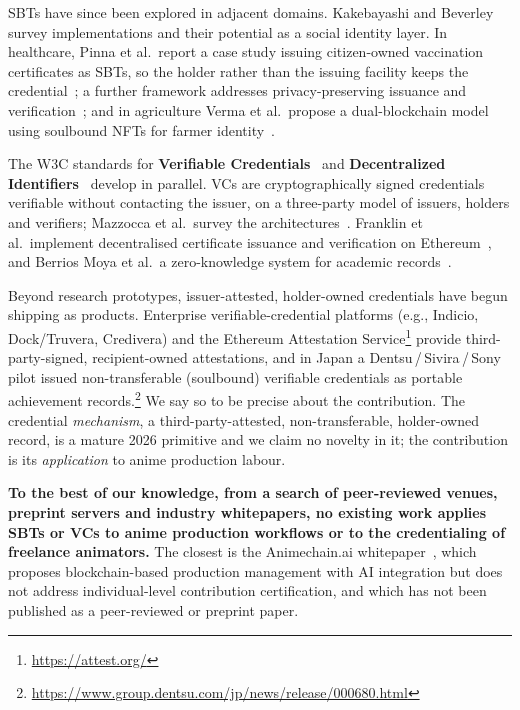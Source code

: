 SBTs have since been explored in adjacent domains. Kakebayashi and
Beverley~\cite{kakebayashi2023sbt} survey implementations and their potential as a social
identity layer. In healthcare, Pinna et al.\ report a case study issuing citizen-owned
vaccination certificates as SBTs, so the holder rather than the issuing facility keeps the
credential~\cite{sbt_health2024}; a further framework addresses privacy-preserving
issuance and verification~\cite{sbt_credential_framework2023}; and in agriculture Verma
et al.\ propose a dual-blockchain model using soulbound NFTs for farmer
identity~\cite{verma2025sbt_agriculture}.

The W3C standards for \textbf{Verifiable Credentials}~\cite{sporny2022vc} and
\textbf{Decentralized Identifiers}~\cite{sporny2022did} develop in parallel. VCs are
cryptographically signed credentials verifiable without contacting the issuer, on a
three-party model of issuers, holders and verifiers; Mazzocca et al.\ survey the
architectures~\cite{did_survey2024}. Franklin et al.\ implement decentralised certificate
issuance and verification on Ethereum~\cite{franklin2025decentralized}, and Berrios Moya
et al.\ a zero-knowledge system for academic records~\cite{berriosmoya2025zkp}.

Beyond research prototypes, issuer-attested, holder-owned credentials have begun
shipping as products. Enterprise verifiable-credential platforms (e.g., Indicio,
Dock/Truvera, Credivera) and the Ethereum Attestation Service\footnote{\url{https://attest.org/}}
provide third-party-signed, recipient-owned attestations, and in Japan a
Dentsu\,/\,Sivira\,/\,Sony pilot issued non-transferable (soulbound) verifiable
credentials as portable achievement records.\footnote{\url{https://www.group.dentsu.com/jp/news/release/000680.html}}
We say so to be precise about the contribution. The credential \emph{mechanism}, a
third-party-attested, non-transferable, holder-owned record, is a mature 2026 primitive
and we claim no novelty in it; the contribution is its \emph{application} to anime
production labour.

\textbf{To the best of our knowledge, from a search of peer-reviewed venues, preprint
servers and industry whitepapers, no existing work applies SBTs or VCs to anime production
workflows or to the credentialing of freelance animators.} The closest is the
Animechain.ai whitepaper~\cite{animechain2024whitepaper}, which proposes blockchain-based
production management with AI integration but does not address individual-level
contribution certification, and which has not been published as a peer-reviewed or
preprint paper.

